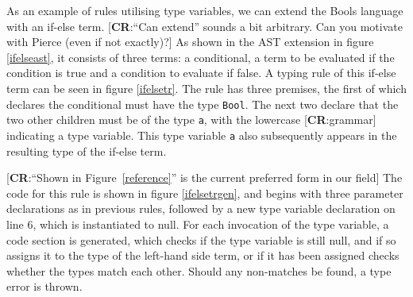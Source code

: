 \documentclass[nofilelist]{cslthse-msc}
\newcommand{\CR}[1]{\textcolor{green!60!black}{[\textbf{CR}:#1]}}
\begin{document}
%
As an example of rules utilising type variables, we can extend the Bools language with an if-else term.
\CR{``Can extend'' sounds a bit arbitrary.  Can you motivate with Pierce (even if not exactly)?}
As shown in the AST extension in figure \ref{ifelseast}, it consists of three terms: a conditional, a term to be evaluated if the condition is true and a condition to evaluate if false.
A typing rule of this if-else term can be seen in figure \ref{ifelsetr}.
The rule has three premises, the first of which declares the conditional must have the type \verb|Bool|.
The next two declare that the two other children must be of the type \verb|a|, with the lowercase \CR{grammar} indicating a type variable.
This type variable \verb|a| also subsequently appears in the resulting type of the if-else term.

\CR{``Shown in Figure~\ref{reference}'' is the current preferred form in our field}
The code for this rule is shown in figure \ref{ifelsetrgen}, and begins with three parameter declarations as in previous rules, followed by a new type variable declaration on line 6, which is instantiated to null.
For each invocation of the type variable, a code section is generated, which checks if the type variable is still null, and if so assigns it to the type of the left-hand side term, or if it has been assigned checks whether the types match each other. Should any non-matches be found, a type error is thrown.
\end{document}
